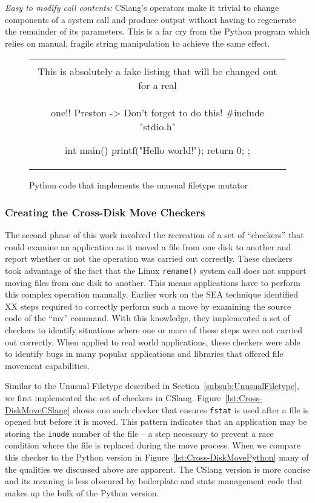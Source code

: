 \textit{Easy to modify call contents:}  CSlang's operators make it
trivial to change components of a system call
and produce output without having to regenerate the remainder of its
parameters.
This is a far cry
from the Python program which relies on manual, fragile string manipulation
to achieve the same effect.


\begin{figure}[H]
\centering
\begin{tabular}{c}
\begin{lstlisting}
\\ This is absolutely a fake listing that will be changed out for a real
\\ one!!  Preston -> Don't forget to do this!
#include "stdio.h"

int main() {
    printf("Hello world!\n");
    return 0;
};
\end{lstlisting}
\end{tabular}
\caption{Python code that implements the unusual filetype mutator}
\label{lst:UnusualFiletypePython}
\end{figure}

\subsubsection{Creating the Cross-Disk Move Checkers}

The second phase of this work involved the recreation of a set of
``checkers'' that could examine an application as it moved a file from one
disk to another and report whether or not the operation was carried
out correctly.  These checkers took advantage of the fact that the Linux
{\tt rename()} system call does not support moving files from one disk to
another.  This means applications have to perform this complex
operation manually.  Earlier work on the SEA technique
identified XX steps required to
correctly perform such a move by examining the source code of the ``mv''
command.  With this knowledge, they
implemented a set of checkers to identify situations where one
or more of these steps were not carried out correctly.
When applied to real world applications,
these checkers were able to identify bugs
in many popular applications and libraries that offered file movement
capabilities.

Similar to the Unusual Filetype described in
Section~\ref{subsub:UnusualFiletype},
we first implemented the
set of checkers in CSlang.  Figure~\ref{lst:Cross-DiskMoveCSlang} shows one
such checker that ensures {\tt fstat} is used after a file is opened but
before it is moved.  This pattern indicates that an application may be
storing the {\tt inode} number of the file -- a step necessary to prevent a race
condition where the file is replaced during the move process.  When
we compare this checker to the Python version in
Figure~\ref{lst:Cross-DiskMovePython} many of the qualities we discussed
above are apparent.  The CSlang version is more concise and its meaning is
less obscured by boilerplate and state management code that makes up the
bulk of the Python version.

